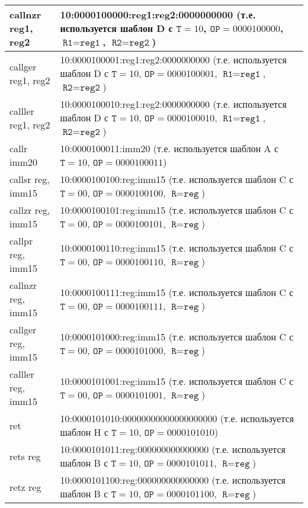 \documentclass[10pt]{report}
\begin{document}
\begin{longtable}[c]{|l|p{12.5cm}|}
callnzr reg1, reg2              & 10:0000100000:reg1:reg2:0000000000 (т.е. используется шаблон D с $\texttt{T}=10$, $\texttt{OP}=0000100000$, $\texttt{R1}=\texttt{reg1}$, $\texttt{R2}=\texttt{reg2}$) \\ \hline
callger reg1, reg2              & 10:0000100001:reg1:reg2:0000000000 (т.е. используется шаблон D с $\texttt{T}=10$, $\texttt{OP}=0000100001$, $\texttt{R1}=\texttt{reg1}$, $\texttt{R2}=\texttt{reg2}$) \\ \hline
calller reg1, reg2              & 10:0000100010:reg1:reg2:0000000000 (т.е. используется шаблон D с $\texttt{T}=10$, $\texttt{OP}=0000100010$, $\texttt{R1}=\texttt{reg1}$, $\texttt{R2}=\texttt{reg2}$) \\ \hline
callr imm20                     & 10:0000100011:imm20 (т.е. используется шаблон A с $\texttt{T}=10$, $\texttt{OP}=0000100011$) \\ \hline
callsr reg, imm15               & 10:0000100100:reg:imm15  (т.е. используется шаблон C с $\texttt{T}=00$, $\texttt{OP}=0000100100$, $\texttt{R}=\texttt{reg}$)\\ \hline
callzr reg, imm15               & 10:0000100101:reg:imm15  (т.е. используется шаблон C с $\texttt{T}=00$, $\texttt{OP}=0000100101$, $\texttt{R}=\texttt{reg}$)\\ \hline
callpr reg, imm15               & 10:0000100110:reg:imm15  (т.е. используется шаблон C с $\texttt{T}=00$, $\texttt{OP}=0000100110$, $\texttt{R}=\texttt{reg}$)\\ \hline
callnzr reg, imm15              & 10:0000100111:reg:imm15  (т.е. используется шаблон C с $\texttt{T}=00$, $\texttt{OP}=0000100111$, $\texttt{R}=\texttt{reg}$)\\ \hline
callger reg, imm15              & 10:0000101000:reg:imm15  (т.е. используется шаблон C с $\texttt{T}=00$, $\texttt{OP}=0000101000$, $\texttt{R}=\texttt{reg}$)\\ \hline
calller reg, imm15              & 10:0000101001:reg:imm15  (т.е. используется шаблон C с $\texttt{T}=00$, $\texttt{OP}=0000101001$, $\texttt{R}=\texttt{reg}$)\\ \hline
ret                             & 10:0000101010:00000000000000000000 (т.е. используется шаблон H с $\texttt{T}=10$, $\texttt{OP}=0000101010$) \\ \hline
rets reg                        & 10:0000101011:reg:000000000000000 (т.е. используется шаблон B с $\texttt{T}=10$, $\texttt{OP}=0000101011$, $\texttt{R}=\texttt{reg}$) \\ \hline
retz reg                        & 10:0000101100:reg:000000000000000 (т.е. используется шаблон B с $\texttt{T}=10$, $\texttt{OP}=0000101100$, $\texttt{R}=\texttt{reg}$) \\ \hline

\end{longtable}
\end{document}

